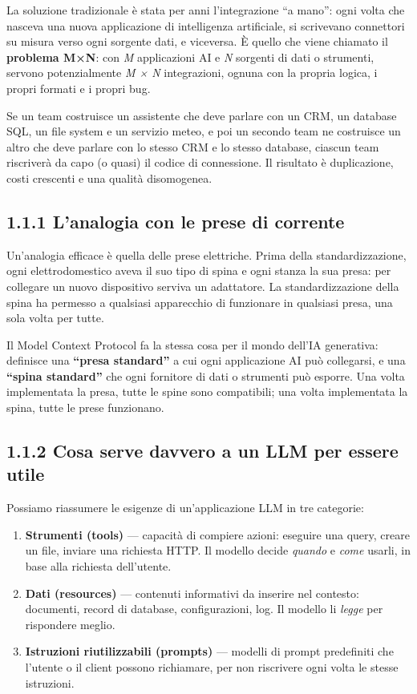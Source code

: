 \documentclass[
  italian,
  10pt,
]{book}
\providecommand{\tightlist}{%
  \setlength{\itemsep}{0pt}\setlength{\parskip}{0pt}}
\begin{document}
La soluzione tradizionale è stata per anni l'integrazione ``a mano'':
ogni volta che nasceva una nuova applicazione di intelligenza
artificiale, si scrivevano connettori su misura verso ogni sorgente
dati, e viceversa. È quello che viene chiamato il \textbf{problema M×N}:
con \emph{M} applicazioni AI e \emph{N} sorgenti di dati o strumenti,
servono potenzialmente \emph{M × N} integrazioni, ognuna con la propria
logica, i propri formati e i propri bug.

Se un team costruisce un assistente che deve parlare con un CRM, un
database SQL, un file system e un servizio meteo, e poi un secondo team
ne costruisce un altro che deve parlare con lo stesso CRM e lo stesso
database, ciascun team riscriverà da capo (o quasi) il codice di
connessione. Il risultato è duplicazione, costi crescenti e una qualità
disomogenea.

\subsection{1.1.1 L'analogia con le prese di
corrente}\label{lanalogia-con-le-prese-di-corrente}

Un'analogia efficace è quella delle prese elettriche. Prima della
standardizzazione, ogni elettrodomestico aveva il suo tipo di spina e
ogni stanza la sua presa: per collegare un nuovo dispositivo serviva un
adattatore. La standardizzazione della spina ha permesso a qualsiasi
apparecchio di funzionare in qualsiasi presa, una sola volta per tutte.

Il Model Context Protocol fa la stessa cosa per il mondo dell'IA
generativa: definisce una \textbf{``presa standard''} a cui ogni
applicazione AI può collegarsi, e una \textbf{``spina standard''} che
ogni fornitore di dati o strumenti può esporre. Una volta implementata
la presa, tutte le spine sono compatibili; una volta implementata la
spina, tutte le prese funzionano.

\subsection{1.1.2 Cosa serve davvero a un LLM per essere
utile}\label{cosa-serve-davvero-a-un-llm-per-essere-utile}

Possiamo riassumere le esigenze di un'applicazione LLM in tre categorie:

\begin{enumerate}
\def\labelenumi{\arabic{enumi}.}
\tightlist
\item
  \textbf{Strumenti (tools)} --- capacità di compiere azioni: eseguire
  una query, creare un file, inviare una richiesta HTTP. Il modello
  decide \emph{quando} e \emph{come} usarli, in base alla richiesta
  dell'utente.
\item
  \textbf{Dati (resources)} --- contenuti informativi da inserire nel
  contesto: documenti, record di database, configurazioni, log. Il
  modello li \emph{legge} per rispondere meglio.
\item
  \textbf{Istruzioni riutilizzabili (prompts)} --- modelli di prompt
  predefiniti che l'utente o il client possono richiamare, per non
  riscrivere ogni volta le stesse istruzioni.
\end{enumerate}
\end{document}

